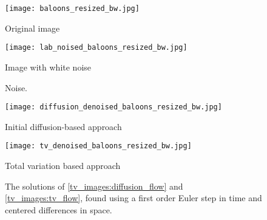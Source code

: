%
%
%
\begin{figure}
\begin{minipage}[b]{.47\linewidth}
\centering
\texttt{[image: baloons\_resized\_bw.jpg]}
\caption*{Original image}
\end{minipage}
\hspace{0.5cm}
\begin{minipage}[b]{0.47\linewidth}
\centering
\texttt{[image: lab\_noised\_baloons\_resized\_bw.jpg]}
\caption*{Image with white noise}
\end{minipage}
\caption{Noise.}
\label{fig:noise_firstattempt}
\end{figure}

\begin{figure}
\begin{minipage}[b]{.47\linewidth}
\centering
\texttt{[image: diffusion\_denoised\_baloons\_resized\_bw.jpg]}
\caption*{Initial diffusion-based approach}
\end{minipage}
\hspace{0.5cm}
\begin{minipage}[b]{0.47\linewidth}
\centering
\texttt{[image: tv\_denoised\_baloons\_resized\_bw.jpg]}
\caption*{Total variation based approach}
\end{minipage}
\caption{The solutions of \eqref{tv_images:diffusion_flow} and \eqref{tv_images:tv_flow}, found using a first order Euler step in time and centered differences in space.}
\label{fig:noise_compare_attempts}
\end{figure}


